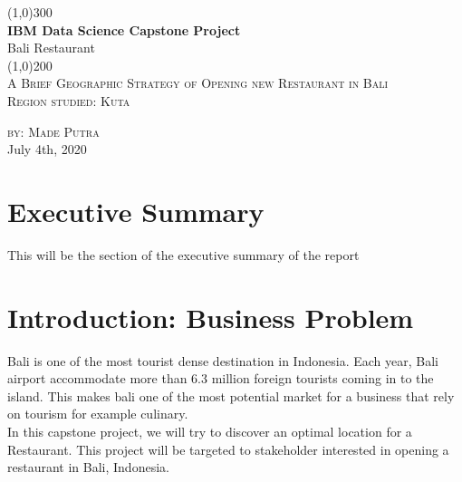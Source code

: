 \documentclass[12pt,letterpaper]{article}
\begin{document}
\begin{titlepage}
	\begin{center}
	\line(1,0){300}\\
	[0.25in]
	\huge{\bfseries IBM Data Science Capstone Project}\\
	\huge{Bali Restaurant}\\
	[0.15in]
	\line(1,0){200}\\
	[0.25in]
	\textsc{\LARGE A Brief Geographic Strategy of Opening new Restaurant in Bali}\\
	[0.15in]
	\textsc{\Large Region studied: Kuta}\\
	[4.7in]
	\end{center}
	\begin{flushright}
	\textsc{\large by:  \Large Made Putra}\\
	July 4th, 2020\\ 
	\end{flushright}
\end{titlepage}

\section*{Executive Summary}
This will be the section of the executive summary of the report
\newpage

\tableofcontents
{} 
\thispagestyle{empty}
\newpage

\listoffigures
{} 
\thispagestyle{empty}
\newpage

\setcounter{page}{1}
\section{Introduction: Business Problem}\label{sec:inrto}

Bali is one of the most tourist dense destination in Indonesia. Each year, Bali airport accommodate more than 6.3 million foreign tourists coming in to the island. This makes bali one of the most potential market for a business that rely on tourism for example culinary.\\
In this capstone project, we will try to discover an optimal location for a Restaurant. This project will be targeted to stakeholder interested in opening a restaurant in Bali, Indonesia.\\
\end{document}
